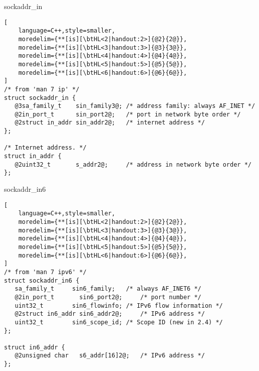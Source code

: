 \begin{frame}[fragile,label=sAddrIn]{sockaddr\_in}
\begin{lstlisting}[
    language=C++,style=smaller,
    moredelim={**[is][\btHL<2|handout:2>]{@2}{2@}},
    moredelim={**[is][\btHL<3|handout:3>]{@3}{3@}},
    moredelim={**[is][\btHL<4|handout:4>]{@4}{4@}},
    moredelim={**[is][\btHL<5|handout:5>]{@5}{5@}},
    moredelim={**[is][\btHL<6|handout:6>]{@6}{6@}},
]
/* from 'man 7 ip' */
struct sockaddr_in {
   @3sa_family_t    sin_family3@; /* address family: always AF_INET */
   @2in_port_t      sin_port2@;   /* port in network byte order */
   @2struct in_addr sin_addr2@;   /* internet address */
};

/* Internet address. */
struct in_addr {
   @2uint32_t       s_addr2@;     /* address in network byte order */
};
\end{lstlisting}
\end{frame}

\begin{frame}[fragile,label=sAddrIn6]{sockaddr\_in6}
\begin{lstlisting}[
    language=C++,style=smaller,
    moredelim={**[is][\btHL<2|handout:2>]{@2}{2@}},
    moredelim={**[is][\btHL<3|handout:3>]{@3}{3@}},
    moredelim={**[is][\btHL<4|handout:4>]{@4}{4@}},
    moredelim={**[is][\btHL<5|handout:5>]{@5}{5@}},
    moredelim={**[is][\btHL<6|handout:6>]{@6}{6@}},
]
/* from 'man 7 ipv6' */
struct sockaddr_in6 {
   sa_family_t     sin6_family;   /* always AF_INET6 */
   @2in_port_t       sin6_port2@;     /* port number */
   uint32_t        sin6_flowinfo; /* IPv6 flow information */
   @2struct in6_addr sin6_addr2@;     /* IPv6 address */
   uint32_t        sin6_scope_id; /* Scope ID (new in 2.4) */
};

struct in6_addr {
   @2unsigned char   s6_addr[16]2@;   /* IPv6 address */
};
\end{lstlisting}
\end{frame}

